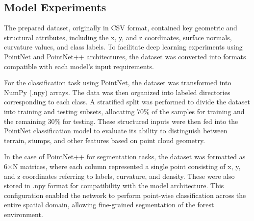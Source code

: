\documentclass[../report.tex]{subfiles}
\begin{document}
	\subsection{Model Experiments}
    The prepared dataset, originally in CSV format, contained key geometric and structural attributes, including the x, y, and z coordinates, surface normals, curvature values, and class labels. To facilitate deep learning experiments using PointNet and PointNet++ architectures, the dataset was converted into formats compatible with each model’s input requirements.

    For the classification task using PointNet, the dataset was transformed into NumPy (.npy) arrays. The data was then organized into labeled directories corresponding to each class. A stratified split was performed to divide the dataset into training and testing subsets, allocating 70\% of the samples for training and the remaining 30\% for testing. These structured inputs were then fed into the PointNet classification model to evaluate its ability to distinguish between terrain, stumps, and other features based on point cloud geometry.
    
    In the case of PointNet++ for segmentation tasks, the dataset was formatted as 6×N matrices, where each column represented a single point consisting of x, y, and z coordinates referring to labels, curvature, and density. These were also stored in .npy format for compatibility with the model architecture. This configuration enabled the network to perform point-wise classification across the entire spatial domain, allowing fine-grained segmentation of the forest environment.
    
\end{document}
